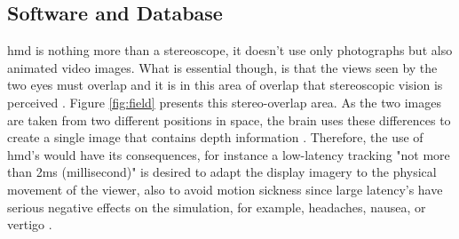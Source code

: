 \subsection{Software and Database}


 \acrshort{hmd} is nothing more than a stereoscope, it doesn't use only photographs but also animated
video images. What is essential though, is that the views seen by the two eyes
must overlap and it is in this area of overlap that stereoscopic vision is perceived \citep{Vince2011}.
Figure \ref{fig:field} presents this stereo-overlap area. As the two images are taken from two different positions in space, the brain uses these
differences to create a single image that contains depth information \citep{Vince2011}. Therefore, the use of \acrshort{hmd}'s would have its consequences, for instance a low-latency tracking "not more than 2ms (millisecond)" is desired to adapt the display imagery to the physical movement of the viewer, also to avoid motion sickness since large latency's have serious negative effects on the simulation, for example, headaches, nausea, or vertigo \citep{burdea2017virtual, Vince2011, Steinicke2016}.




  
